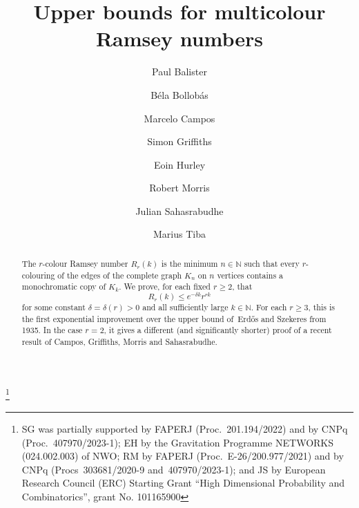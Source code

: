 \documentclass[12pt,reqno]{amsart}
\theoremstyle{definition}
\theoremstyle{remark}
\newcommand\N{\mathbb{N}}
\renewcommand{\le}{\leqslant}
\renewcommand{\ge}{\geqslant}
\def\N{\mathbb{N}}
\begin{document}
\title{Upper bounds for multicolour Ramsey numbers}

\author{Paul Balister \and B\'ela Bollob\'as \and Marcelo Campos \and Simon Griffiths \and Eoin Hurley\and Robert Morris \and Julian Sahasrabudhe \and Marius Tiba}

\address{Mathematical Institute, University of Oxford, Radcliffe Observatory Quarter, Woodstock Road, Oxford, OX2 6GG, UK}

\address{Department of Pure Mathematics and Mathematical Statistics, Wilberforce Road, Cambridge, CB3 0WA, UK, and Department of Mathematical Sciences, University of Memphis, Memphis, TN 38152, USA}

\address{IMPA, Estrada Dona Castorina 110, Jardim Bot\^anico, Rio de Janeiro, 22460-320, Brasil}

\address{Departamento de Matem\'atica, PUC-Rio, Rua Marqu\^{e}s de S\~{a}o Vicente 225, G\'avea, 22451-900 Rio de Janeiro, Brasil}

\address{Mathematical Institute, University of Oxford, Radcliffe Observatory Quarter, Woodstock Road, Oxford, OX2 6GG, UK}

\address{IMPA, Estrada Dona Castorina 110, Jardim Bot\^anico, Rio de Janeiro, 22460-320, Brasil}

\address{Department of Pure Mathematics and Mathematical Statistics, Wilberforce Road, Cambridge, CB3 0WA, UK}

\address{Institute of Mathematics, EPFL SB MATH, MA A2 383 (Bâtiment MA), Station 8, CH-1015 Lausanne, Switzerland}


\thanks{SG was partially supported by FAPERJ (Proc.~201.194/2022) and by CNPq (Proc.~407970/2023-1); EH by the Gravitation Programme NETWORKS (024.002.003) of NWO;  RM by FAPERJ (Proc.~E-26/200.977/2021) and by CNPq (Procs~303681/2020-9 and~407970/2023-1); and JS by European Research Council (ERC) Starting Grant “High Dimensional Probability and Combinatorics”, grant No. 101165900}

\begin{abstract}
The $r$-colour Ramsey number $R_r(k)$ is the minimum $n \in \N$ such that every $r$-colouring of the edges of the complete graph $K_n$ on $n$ vertices contains a monochromatic copy of $K_k$. We prove, for each fixed $r \ge 2$, that 
$$R_r(k) \le e^{-\delta k} r^{rk}$$ 
for some constant $\delta = \delta(r) > 0$ and all sufficiently large $k \in \N$. For each $r \ge 3$, this is the first exponential improvement over the upper bound of~Erd\H{o}s and Szekeres from 1935. In the case $r = 2$, it gives a different (and significantly shorter) proof of a recent result of Campos, Griffiths, Morris and Sahasrabudhe.  
\end{abstract}
\end{document}
